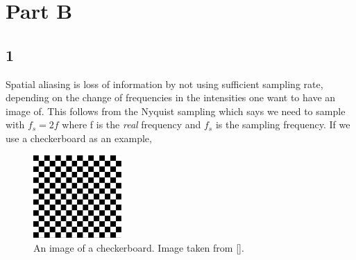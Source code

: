 {\section{Part B}
\subsection{1}
Spatial aliasing is loss of information by not using sufficient sampling rate, depending on the change of frequencies in the intensities one want to have an image of. This follows from the Nyquist sampling which says we need to sample with $f_{s} = 2f$ where f is the \emph{real} frequency and $f_{s}$ is the sampling frequency. If we use a checkerboard as an example,

\begin{figure}[!htb]
{\centering
    \includegraphics[width=0.30\textwidth]{checker1.png}
    \caption{An image of a checkerboard. Image taken from [\cite{dip}].}
    \label{checker1}
\par}
\end{figure}



}
